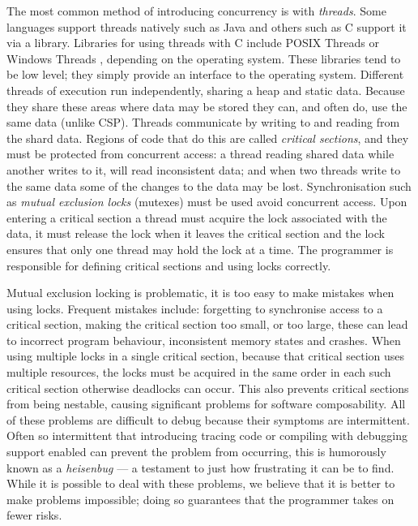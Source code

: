 The most common method of introducing concurrency is with \emph{threads}.
Some languages support threads natively such as Java \citep{java-threads}
and others such as C \citep{c} support it via a library.
Libraries for using threads with C include
POSIX Threads \citep{butenhof1997:pthreads} or Windows
Threads \citep{winthreads}, depending on the operating system.
These libraries tend to be low level;
they simply provide an interface to the operating system.
Different threads of execution run independently,
sharing a heap and static data.
Because they share these areas where data may be stored they can, and often do,
use the same data (unlike CSP).
Threads communicate by writing to and reading from the shard data.
Regions of code that do this are called \emph{critical sections},
and they must be protected from concurrent access:
a thread reading shared data while another writes to it, will read
inconsistent data;
and when two threads write to the same data some of the changes to the data
may be lost.
Synchronisation such as \emph{mutual exclusion locks} (mutexes)
\citep{Dijkstra:Mutex} must be used avoid concurrent access.
Upon entering a critical section a thread must acquire the lock associated with
the data,
it must release the lock when it leaves the critical section and the lock
ensures that only one thread may hold the lock at a time.
The programmer is responsible for defining critical sections and using locks
correctly.

Mutual exclusion locking is problematic,
it is too easy to make mistakes when using locks.
Frequent mistakes include: forgetting to synchronise access to a critical
section,
making the critical section too small, or too large,
these can lead to incorrect program behaviour, inconsistent memory states and
crashes.
When using multiple locks in a single critical section,
because that critical section uses multiple resources,
the locks must be acquired in the same order in each such critical section
otherwise deadlocks can occur.
This also prevents critical sections from being nestable,
causing significant problems for software composability.
All of these problems are difficult to debug because their symptoms are
intermittent.
Often so intermittent that introducing tracing code or compiling with debugging
support enabled can prevent the problem from occurring,
this is humorously known as a \emph{heisenbug} ---
a testament to just how frustrating it can be to find.
While it is possible to deal with these problems,
we believe that it is better to make problems impossible;
doing so guarantees that the programmer takes on fewer risks.


